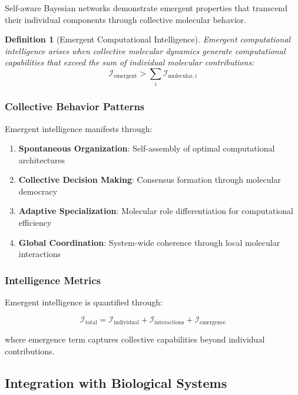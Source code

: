 \documentclass[12pt,a4paper]{article}
\newtheorem{definition}[theorem]{Definition}
\begin{document}
Self-aware Bayesian networks demonstrate emergent properties that transcend their individual components through collective molecular behavior.

\begin{definition}[Emergent Computational Intelligence]
Emergent computational intelligence arises when collective molecular dynamics generate computational capabilities that exceed the sum of individual molecular contributions:
\begin{equation}
\mathcal{I}_{\text{emergent}} > \sum_i \mathcal{I}_{\text{molecular},i}
\end{equation}
\end{definition}

\subsubsection{Collective Behavior Patterns}

Emergent intelligence manifests through:

\begin{enumerate}
\item \textbf{Spontaneous Organization}: Self-assembly of optimal computational architectures
\item \textbf{Collective Decision Making}: Consensus formation through molecular democracy
\item \textbf{Adaptive Specialization}: Molecular role differentiation for computational efficiency
\item \textbf{Global Coordination}: System-wide coherence through local molecular interactions
\end{enumerate}

\subsubsection{Intelligence Metrics}

Emergent intelligence is quantified through:

\begin{equation}
\mathcal{I}_{\text{total}} = \mathcal{I}_{\text{individual}} + \mathcal{I}_{\text{interactions}} + \mathcal{I}_{\text{emergence}}
\end{equation}

where emergence term captures collective capabilities beyond individual contributions.

\subsection{Integration with Biological Systems}
\end{document}
